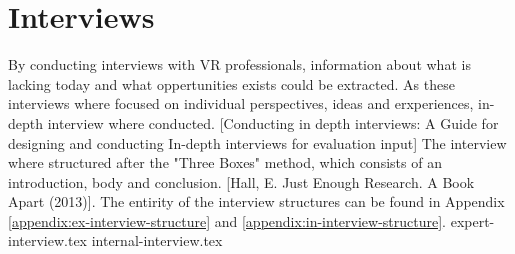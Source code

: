 \section{Interviews}
By conducting interviews with VR professionals, information about what is lacking today and what oppertunities exists could be extracted. As these interviews where focused on individual perspectives, ideas and erxperiences, in-depth interview where conducted.
[Conducting in depth interviews: A Guide for designing and conducting
In-depth interviews for evaluation input] The interview where structured after the "Three Boxes" method, which consists of an introduction, body and conclusion. [Hall, E. Just Enough Research. A Book Apart (2013)]. The entirity of the interview structures can be found in Appendix \ref{appendix:ex-interview-structure} and \ref{appendix:in-interview-structure}.
{expert-interview.tex}
{internal-interview.tex}
